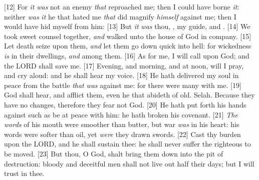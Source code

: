 [12] \textcolor[cmyk]{0.99998,1,0,0}{For \emph{it} \emph{was} not an enemy \emph{that} reproached me; then I could have borne \emph{it}: neither \emph{was} \emph{it} he that hated me \emph{that} did magnify \emph{himself} against me; then I would have hid myself from him:}
[13] \textcolor[cmyk]{0.99998,1,0,0}{But \emph{it} \emph{was} thou, , my guide, and .}
[14] \textcolor[cmyk]{0.99998,1,0,0}{We took sweet counsel together, \emph{and} walked unto the house of God in company.}
[15] \textcolor[cmyk]{0.99998,1,0,0}{Let death seize upon them, \emph{and} let them go down quick into hell: for wickedness \emph{is} in their dwellings, \emph{and} among them.}
[16] \textcolor[cmyk]{0.99998,1,0,0}{As for me, I will call upon God; and the LORD shall save me.}
[17] \textcolor[cmyk]{0.99998,1,0,0}{Evening, and morning, and at noon, will I pray, and cry aloud: and he shall hear my voice.}
[18] \textcolor[cmyk]{0.99998,1,0,0}{He hath delivered my soul in peace from the battle \emph{that} \emph{was} against me: for there were many with me.}
[19] \textcolor[cmyk]{0.99998,1,0,0}{God shall hear, and afflict them, even he that abideth of old. Selah. Because they have no changes, therefore they fear not God.}
[20] \textcolor[cmyk]{0.99998,1,0,0}{He hath put forth his hands against such as be at peace with him: he hath broken his covenant.}
[21] \textcolor[cmyk]{0.99998,1,0,0}{\emph{The} \emph{words} of his mouth were smoother than butter, but war \emph{was} in his heart: his words were softer than oil, yet \emph{were} they drawn swords.}
[22] \textcolor[cmyk]{0.99998,1,0,0}{Cast thy burden upon the LORD, and he shall sustain thee: he shall never suffer the righteous to be moved.}
[23] \textcolor[cmyk]{0.99998,1,0,0}{But thou, O God, shalt bring them down into the pit of destruction: bloody and deceitful men shall not live out half their days; but I will trust in thee.}




